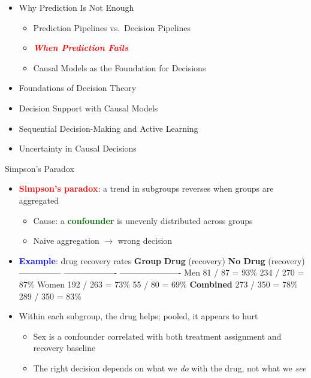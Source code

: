 \documentclass[
  10pt,
  ignorenonframetext,
]{beamer}
\providecommand{\tightlist}{%
  \setlength{\itemsep}{0pt}\setlength{\parskip}{0pt}}
\begin{document}
\begin{frame}{}
\label{section-2}
\begin{itemize}
\tightlist
\item
  Why Prediction Is Not Enough

  \begin{itemize}
  \tightlist
  \item
    Prediction Pipelines vs.~Decision Pipelines
  \item
    \emph{\textbf{\textcolor{red}{When Prediction Fails}}}
  \item
    Causal Models as the Foundation for Decisions
  \end{itemize}
\item
  Foundations of Decision Theory
\item
  Decision Support with Causal Models
\item
  Sequential Decision-Making and Active Learning
\item
  Uncertainty in Causal Decisions
\end{itemize}
\end{frame}

\begin{frame}{Simpson's Paradox}
\label{simpsons-paradox}
\begin{itemize}
\item
  \textbf{\textcolor{red}{Simpson's paradox}}: a trend in subgroups
  reverses when groups are aggregated

  \begin{itemize}
  \tightlist
  \item
    Cause: a \textbf{\textcolor{darkgreen}{confounder}} is unevenly
    distributed across groups
  \item
    Naive aggregation \(\to\) wrong decision
  \end{itemize}
\item
  \textbf{\textcolor{blue}{Example}}: drug recovery rates
  \begingroup \scriptsize \textbar{} \textbf{Group} \textbar{}
  \textbf{Drug} (recovery) \textbar{} \textbf{No Drug} (recovery)
  \textbar{} \textbar{} --------------- \textbar{} -------------------
  \textbar{} ---------------------- \textbar{} \textbar{} Men \textbar{}
  81 / 87 = 93\% \textbar{} 234 / 270 = 87\% \textbar{} \textbar{} Women
  \textbar{} 192 / 263 = 73\% \textbar{} 55 / 80 = 69\% \textbar{}
  \textbar{} \textbf{Combined} \textbar{} 273 / 350 = 78\% \textbar{}
  289 / 350 = 83\% \textbar{} \endgroup
\item
  Within each subgroup, the drug helps; pooled, it appears to hurt

  \begin{itemize}
  \tightlist
  \item
    Sex is a confounder correlated with both treatment assignment and
    recovery baseline
  \item
    The right decision depends on what we \emph{do} with the drug, not
    what we \emph{see}
  \end{itemize}
\end{itemize}
\end{frame}
\end{document}
